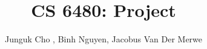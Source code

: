 \documentclass[letterpaper,twocolumn,10pt]{article}
\title{CS 6480: Project}
\author[1]{Junguk Cho , Binh Nguyen, Jacobus Van Der Merwe}
\affil[1]{School of Computing, University of Utah}
\begin{document}
\maketitle














{
  \small 
  
  
}
\end{document}
